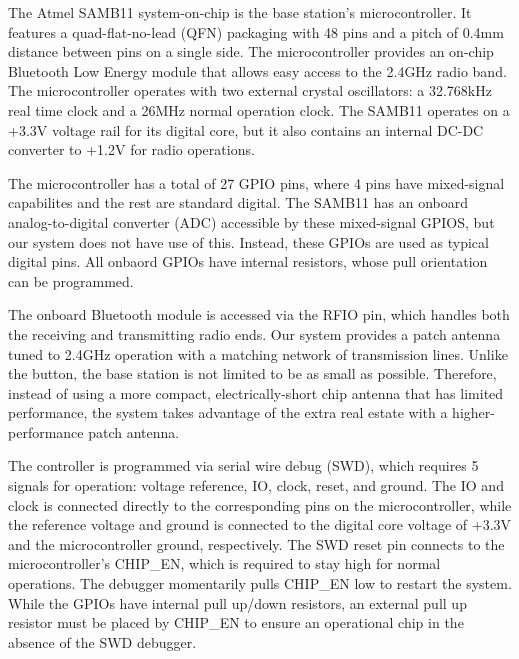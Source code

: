 \documentclass[journal,compsoc]{IEEEtran}
\begin{document}
The Atmel SAMB11 system-on-chip is the base station's microcontroller. It features a quad-flat-no-lead (QFN) packaging with 48 pins and a pitch of 0.4mm distance between pins on a single side. The microcontroller provides an on-chip Bluetooth Low Energy module that allows easy access to the 2.4GHz radio band. The microcontroller operates with two external crystal oscillators: a 32.768kHz real time clock and a 26MHz normal operation clock. The SAMB11 operates on a +3.3V voltage rail for its digital core, but it also contains an internal DC-DC converter to +1.2V for radio operations.

The microcontroller has a total of 27 GPIO pins, where 4 pins have mixed-signal capabilites and the rest are standard digital. The SAMB11 has an onboard analog-to-digital converter (ADC) accessible by these mixed-signal GPIOS, but our system does not have use of this. Instead, these GPIOs are used as typical digital pins. All onbaord GPIOs have internal resistors, whose pull orientation can be programmed.

The onboard Bluetooth module is accessed via the RFIO pin, which handles both the receiving and transmitting radio ends. Our system provides a patch antenna tuned to 2.4GHz operation with a matching network of transmission lines. Unlike the button, the base station is not limited to be as small as possible. Therefore, instead of using a more compact, electrically-short chip antenna that has limited performance, the system takes advantage of the extra real estate with a higher-performance patch antenna.

The controller is programmed via serial wire debug (SWD), which requires 5 signals for operation: voltage reference, IO, clock, reset, and ground. The IO and clock is connected directly to the corresponding pins on the microcontroller, while the reference voltage and ground is connected to the digital core voltage of +3.3V and the microcontroller ground, respectively. The SWD reset pin connects to the microcontroller's CHIP\_EN, which is required to stay high for normal operations. The debugger momentarily pulls CHIP\_EN low to restart the system. While the GPIOs have internal pull up/down resistors, an external pull up resistor must be placed by CHIP\_EN to ensure an operational chip in the absence of the SWD debugger.
\end{document}
